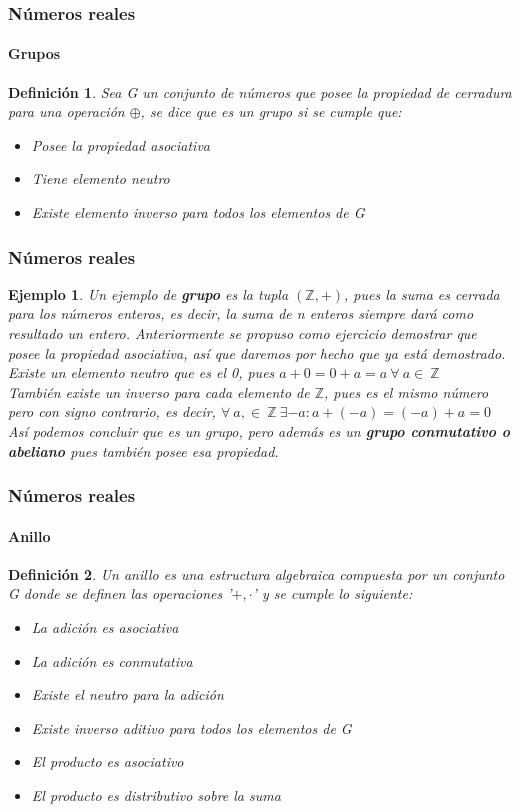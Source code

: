 \documentclass[11pt]{beamer}
\newtheorem{defi}{Definición}
\newtheorem{ejem}{Ejemplo}
\begin{document}
\begin{frame}
\frametitle{Números reales}
\framesubtitle{Grupos}
\begin{defi}
Sea G un conjunto de números que posee la propiedad de cerradura para una operación $\oplus$, se dice que es un grupo
si se cumple que:
\begin{itemize}
\item Posee la propiedad asociativa
\item Tiene elemento neutro
\item Existe elemento inverso para todos los elementos de G
\end{itemize}
\end{defi}
\end{frame}

\begin{frame}
\frametitle{Números reales}
\begin{ejem}
Un ejemplo de \textbf{grupo} es la tupla $(\mathbb{Z},+)$, pues la suma es cerrada para los números enteros, es decir, la suma de n enteros siempre dará como resultado un entero. Anteriormente se propuso como ejercicio demostrar que posee la propiedad asociativa, así que daremos por hecho que ya está demostrado. \\
Existe un elemento neutro que es el 0, pues $a + 0 = 0 + a = a~\forall~a\in~\mathbb{Z}$\\
También existe un inverso para cada elemento de $\mathbb{Z}$, pues es el mismo número pero con signo contrario, es decir, $\forall~a, \in~\mathbb{Z}~\exists -a: a + (-a) = (-a) + a = 0$\\
Así podemos concluir que es un grupo, pero además es un \textbf{grupo conmutativo o abeliano} pues también posee esa propiedad.
\end{ejem}
\end{frame}


\begin{frame}
\frametitle{Números reales}
\framesubtitle{Anillo}
\begin{defi}
Un anillo es una estructura algebraica compuesta por un conjunto G donde se definen las operaciones '$+,\cdot$' y se cumple lo siguiente: 
\\
\begin{itemize}
\item La adición es asociativa
\item La adición es conmutativa
\item Existe el neutro para la adición
\item Existe inverso aditivo para todos los elementos de G
\item El producto es asociativo
\item El producto es distributivo sobre la suma
\end{itemize}
\end{defi}
\end{frame}
\end{document}
